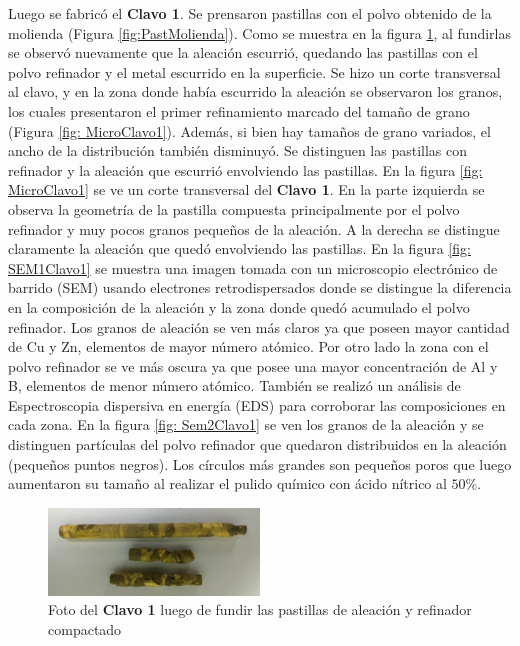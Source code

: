\documentclass[a4paper,12pt,fleqn,twoside,openany]{book}
\begin{document}
Luego se fabricó el \textbf{Clavo 1}. Se prensaron pastillas con el polvo obtenido de la molienda (Figura \ref{fig:PastMolienda}). Como se muestra en la figura \ref{fig: Clavo1}, al fundirlas se observó nuevamente que la aleación escurrió, quedando las pastillas con el polvo refinador y el metal escurrido en la superficie. Se hizo un corte transversal al clavo, y en la zona donde había escurrido la aleación se observaron los granos, los cuales presentaron el primer refinamiento marcado del tamaño de grano (Figura \ref{fig: MicroClavo1}). Además, si bien hay tamaños de grano variados, el ancho de la distribución también disminuyó.  Se distinguen las pastillas con refinador y la aleación que escurrió envolviendo las pastillas. En la figura \ref{fig: MicroClavo1} se ve un corte transversal del \textbf{Clavo 1}. En la parte izquierda se observa la geometría de la pastilla compuesta principalmente por el polvo refinador y muy pocos granos pequeños de la aleación. A la derecha se distingue claramente la aleación que quedó envolviendo las pastillas. En la figura \ref{fig: SEM1Clavo1} se muestra una imagen tomada con un microscopio electrónico de barrido (SEM) usando electrones retrodispersados donde se distingue la diferencia en la composición de la aleación y la zona donde quedó acumulado el polvo refinador. Los granos de aleación se ven más claros ya que poseen mayor cantidad de Cu y Zn, elementos de mayor número atómico. Por otro lado la zona con el polvo refinador se ve más oscura ya que posee una mayor concentración de Al y B, elementos de menor número atómico. También se realizó un análisis de Espectroscopia dispersiva en energía (EDS) para corroborar las composiciones en cada zona. En la figura \ref{fig: Sem2Clavo1} se ven los granos de la aleación y se distinguen partículas del polvo refinador que quedaron distribuidos en la aleación (pequeños puntos negros). Los círculos más grandes son pequeños poros que luego aumentaron su tamaño al realizar el pulido químico con ácido nítrico al $50 \%$.



 \begin{figure}[h]
 \centering
 \includegraphics[width=0.5\textwidth]{Img/Resultados/clavos/Clavo1_Foto2.jpg}
 \caption{Foto del \textbf{Clavo 1} luego de fundir las pastillas de aleación y refinador compactado} 
 \label{fig: Clavo1}
 \end{figure}
\end{document}

